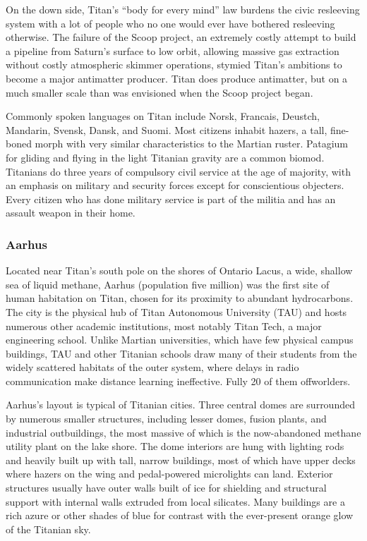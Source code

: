 On the down side, Titan's ``body for every mind'' 
law burdens the civic resleeving system with a lot of 
people who no one would ever have bothered resleeving otherwise. The failure of the Scoop project, an 
extremely costly attempt to build a pipeline from 
Saturn's surface to low orbit, allowing massive gas 
extraction without costly atmospheric skimmer operations, stymied Titan's ambitions to become a major 
antimatter producer. Titan does produce antimatter, 
but on a much smaller scale than was envisioned 
when the Scoop project began.

Commonly spoken languages on Titan include 
Norsk, Francais, Deustch, Mandarin, Svensk, Dansk, 
and Suomi. Most citizens inhabit hazers, a tall, fine-boned morph with very similar characteristics to 
the Martian ruster. Patagium for gliding and flying 
in the light Titanian gravity are a common biomod. 
Titanians do three years of compulsory civil service 
at the age of majority, with an emphasis on military 
and security forces except for conscientious objecters. 
Every citizen who has done military service is part of 
the militia and has an assault weapon in their home.

\subsubsection{Aarhus}

Located near Titan's south pole on the shores of Ontario Lacus, a wide, shallow sea of liquid methane, 
Aarhus (population five million) was the first site of 
human habitation on Titan, chosen for its proximity 
to abundant hydrocarbons. The city is the physical 
hub of Titan Autonomous University (TAU) and hosts 
numerous other academic institutions, most notably 
Titan Tech, a major engineering school. Unlike Martian universities, which have few physical campus 
buildings, TAU and other Titanian schools draw 
many of their students from the widely scattered 
habitats of the outer system, where delays in radio 
communication make distance learning ineffective. 
Fully 20%
of them offworlders.

Aarhus's layout is typical of Titanian cities. Three 
central domes are surrounded by numerous smaller 
structures, including lesser domes, fusion plants, and 
industrial outbuildings, the most massive of which is 
the now-abandoned methane utility plant on the lake 
shore. The dome interiors are hung with lighting rods 
and heavily built up with tall, narrow buildings, most 
of which have upper decks where hazers on the wing 
and pedal-powered microlights can land. Exterior 
structures usually have outer walls built of ice for 
shielding and structural support with internal walls 
extruded from local silicates. Many buildings are a 
rich azure or other shades of blue for contrast with 
the ever-present orange glow of the Titanian sky.

